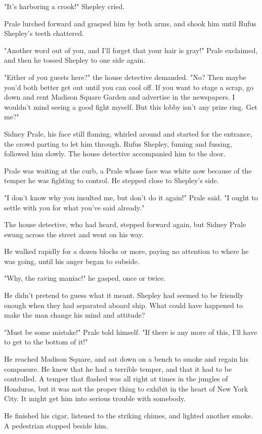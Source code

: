 \documentclass{novel}
\begin{document}
"It's harboring a crook!" Shepley cried.

Prale lurched forward and grasped him by both arms, and shook him until Rufus Shepley's teeth chattered.

"Another word out of you, and I'll forget that your hair is gray!" Prale exclaimed, and then he tossed Shepley to one side again.

"Either of you guests here?" the house detective demanded. "No? Then maybe you'd both better get out until you can cool off. If you want to stage a scrap, go down and rent Madison Square Garden and advertise in the newspapers. I wouldn't mind seeing a good fight myself. But this lobby isn't any prize ring. Get me?"

Sidney Prale, his face still flaming, whirled around and started for the entrance, the crowd parting to let him through. Rufus Shepley, fuming and fussing, followed him slowly. The house detective accompanied him to the door.

Prale was waiting at the curb, a Prale whose face was white now because of the temper he was fighting to control. He stepped close to Shepley's side.

"I don't know why you insulted me, but don't do it again!" Prale said. "I ought to settle with you for what you've said already."

The house detective, who had heard, stepped forward again, but Sidney Prale swung across the street and went on his way.

He walked rapidly for a dozen blocks or more, paying no attention to where he was going, until his anger began to subside.

"Why, the raving maniac!" he gasped, once or twice.

He didn't pretend to guess what it meant. Shepley had seemed to be friendly enough when they had separated aboard ship. What could have happened to make the man change his mind and attitude?

"Must be some mistake!" Prale told himself. "If there is any more of this, I'll have to get to the bottom of it!"

He reached Madison Square, and sat down on a bench to smoke and regain his composure. He knew that he had a terrible temper, and that it had to be controlled. A temper that flashed was all right at times in the jungles of Honduras, but it was not the proper thing to exhibit in the heart of New York City. It might get him into serious trouble with somebody.

He finished his cigar, listened to the striking chimes, and lighted another smoke. A pedestrian stopped beside him.
\end{document}
